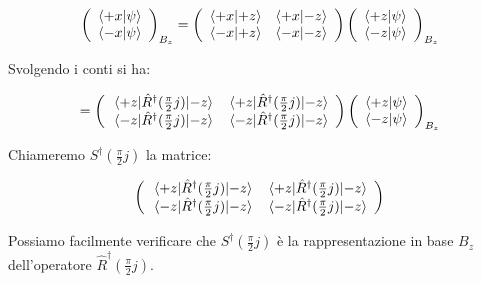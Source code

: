 	\begin{equation}
		\left ( \begin{array}{c}
			\braket{+x}{\psi} \\
			\braket{-x}{\psi} \\
		\end{array} \right )_{B_z} = 
		\left ( \begin{array}{c c}
			\braket{+x}{+z} & \braket{+x}{-z} \\
			\braket{-x}{+z} & \braket{-x}{-z}
		\end{array} \right )
		\left ( \begin{array}{c}
			\braket{+z}{\psi} \\
			\braket{-z}{\psi} \\
		\end{array} \right )_{B_z}  
	\end{equation}

Svolgendo i conti si ha:

	\begin{equation}	
		=
		\left ( \begin{array}{c c}
			\mel{+z}{\hat{R}^\dagger ( \tfrac{\pi}{2} j )}{-z} & \mel{+z}{\hat{R}^\dagger ( \tfrac{\pi}{2}j )}{-z} \\ 
			\mel{-z}{\hat{R}^\dagger ( \tfrac{\pi}{2} j )}{-z} & \mel{-z}{\hat{R}^\dagger ( \tfrac{\pi}{2}j )}{-z} \\ 
		\end{array} \right )
		\left ( \begin{array}{c}
			\braket{+z}{\psi} \\
			\braket{-z}{\psi} \\
		\end{array} \right )_{B_z} 
	\end{equation}

Chiameremo $S^\dagger ( \tfrac{\pi}{2} j )$ la matrice:

	\[
		\left ( \begin{array}{c c}
			\mel{+z}{\hat{R}^\dagger ( \tfrac{\pi}{2} j)}{-z} & \mel{+z}{\hat{R}^\dagger ( \tfrac{\pi}{2} j)}{-z} \\ 
			\mel{-z}{\hat{R}^\dagger ( \tfrac{\pi}{2} j)}{-z} & \mel{-z}{\hat{R}^\dagger ( \tfrac{\pi}{2} j)}{-z} \\ 
		\end{array} \right )
	\]

Possiamo facilmente verificare che $S^\dagger ( \tfrac{\pi}{2} j )$ \`e la rappresentazione in base $B_z$ dell'operatore $\hat{R}^\dagger ( \tfrac{\pi}{2} j)$.

